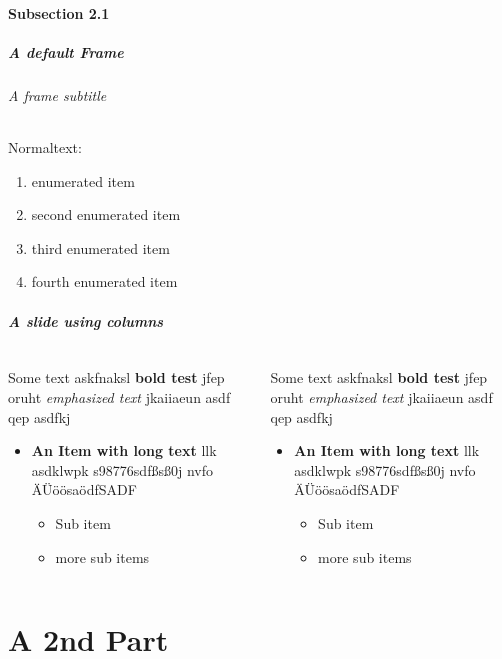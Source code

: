 \documentclass[german,aspectratio=169,notoc,draft]{tudbeamer}%
\begin{document}
\subsection{Subsection 2.1}
\begin{frame}
	\frametitle{A default Frame}
	\framesubtitle{A frame subtitle}

	Normaltext:
	\begin{enumerate}
		\item enumerated item
		\item second enumerated item
		\item third enumerated item
		\item fourth enumerated item
	\end{enumerate}
\end{frame}
\begin{frame}
	\frametitle{A slide using columns}
	\begin{columns}
	   	\begin{column}{.5\textwidth}
	   		Some text askfnaksl \textbf{bold test} jfep oruht \emph{emphasized text} jkaiiaeun asdf qep  asdfkj  
	   		\begin{itemize}
	   			\item \textbf{An Item with long text} llk asdklwpk s98776sdfßsß0j nvfo ÄÜöösaödfSADF
	   			\begin{itemize}
	   				\item Sub item
	   				\item more sub items
	   			\end{itemize}
	   		\end{itemize}
		\end{column}
	   	\begin{column}{.5\textwidth}
	   		Some text askfnaksl \textbf{bold test} jfep oruht \emph{emphasized text} jkaiiaeun asdf qep  asdfkj  
	   		\begin{itemize}
	   			\item \textbf{An Item with long text} llk asdklwpk s98776sdfßsß0j nvfo ÄÜöösaödfSADF
	   			\begin{itemize}
	   				\item Sub item
	   				\item more sub items
	   			\end{itemize}
	   		\end{itemize}
		\end{column}
	\end{columns}
\end{frame}

\part{A 2nd Part}
\end{document}

